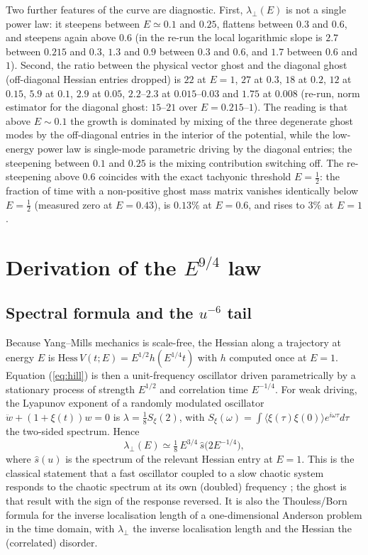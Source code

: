 \documentclass[11pt,a4paper]{article}
\newcommand{\Hess}{\mathrm{Hess}\,}
\begin{document}
Two further features of the curve are diagnostic. First, $\lambda_\perp(E)$ is not a single power
law: it steepens between $E\simeq0.1$ and $0.25$, flattens between $0.3$ and $0.6$, and steepens
again above $0.6$ (in the re-run the local logarithmic slope is $2.7$ between $0.215$ and $0.3$,
$1.3$ and $0.9$ between $0.3$ and $0.6$, and $1.7$ between $0.6$ and $1$). Second, the ratio
between the physical vector ghost and the diagonal ghost (off-diagonal Hessian entries dropped)
is $22$ at $E=1$, $27$ at $0.3$, $18$ at $0.2$, $12$ at $0.15$, $5.9$ at $0.1$, $2.9$ at $0.05$,
$2.2$--$2.3$ at $0.015$--$0.03$ and $1.75$ at $0.008$ (re-run, norm estimator for the diagonal
ghost: $15$--$21$ over $E=0.215$--$1$).
The reading is that
above $E\sim0.1$ the growth is dominated by mixing of the three degenerate ghost modes by the
off-diagonal entries in the interior of the potential, while the low-energy power law is
single-mode parametric driving by the diagonal entries; the steepening between $0.1$ and $0.25$
is the mixing contribution switching off. The re-steepening above $0.6$ coincides with the exact
tachyonic threshold $E=\tfrac12$: the fraction of time with a non-positive ghost mass matrix
vanishes identically below $E=\tfrac12$ (measured zero at $E=0.43$), is $0.13\%$ at $E=0.6$, and
rises to $3\%$ at $E=1$.

\section{Derivation of the $E^{9/4}$ law}
\label{sec:derivation}

\subsection{Spectral formula and the $u^{-6}$ tail}

Because Yang--Mills mechanics is scale-free, the Hessian along a trajectory at energy $E$ is
$\Hess V(t;E)=E^{1/2}h(E^{1/4}t)$ with $h$ computed once at $E=1$. Equation (\ref{eq:hill}) is
then a unit-frequency oscillator driven parametrically by a stationary process of strength
$E^{1/2}$ and correlation time $E^{-1/4}$. For weak driving, the Lyapunov exponent of a randomly
modulated oscillator $\ddot w+(1+\xi(t))w=0$ is \cite{APW86,Jarzynski93}
$\lambda=\tfrac18S_\xi(2)$, with $S_\xi(\omega)=\int\langle\xi(\tau)\xi(0)\rangle e^{i\omega\tau}
d\tau$ the two-sided spectrum. Hence
\begin{equation}
\lambda_\perp(E)\simeq\tfrac18\,E^{3/4}\,\hat s\!\big(2E^{-1/4}\big),
\label{eq:spectral}
\end{equation}
where $\hat s(u)$ is the spectrum of the relevant Hessian entry at $E=1$. This is the classical
statement that a fast oscillator coupled to a slow chaotic system responds to the chaotic
spectrum at its own (doubled) frequency \cite{Ott79,Jarzynski93}; the ghost is that result with
the sign of the response reversed. It is also the Thouless/Born formula for the inverse
localisation length of a one-dimensional Anderson problem in the time domain, with $\lambda_\perp$
the inverse localisation length and the Hessian the (correlated) disorder.
\end{document}
